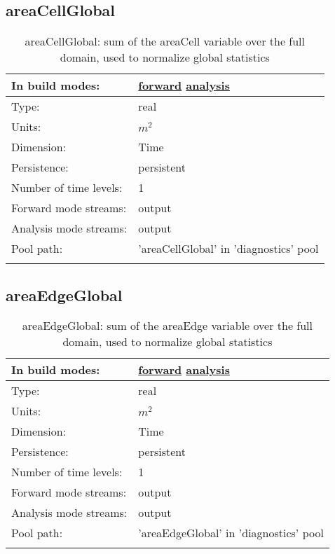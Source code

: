 \subsection[areaCellGlobal]{areaCellGlobal}
\label{subsec:var_sec_diagnostics_areaCellGlobal}
\begin{center}
\begin{longtable}{| p{2.0in} | p{4.0in} |}
        \hline 
        In build modes: & \hyperref[subsec:forward_var_tab_diagnostics]{forward} \hyperref[subsec:analysis_var_tab_diagnostics]{analysis} \\
        \hline 
        Type: & real \\
        \hline 
        Units: & $m^2$ \\
        \hline 
        Dimension: & Time \\
        \hline 
        Persistence: & persistent \\
        \hline 
        Number of time levels: & 1 \\
        \hline 
		 Forward mode streams: &  output \\
        \hline 
		 Analysis mode streams: &  output \\
        \hline 
            Pool path: & 'areaCellGlobal' in 'diagnostics' pool
 \\
		 \hline 
    \caption{areaCellGlobal: sum of the areaCell variable over the full domain, used to normalize global statistics}
\end{longtable}
\end{center}
\subsection[areaEdgeGlobal]{areaEdgeGlobal}
\label{subsec:var_sec_diagnostics_areaEdgeGlobal}
\begin{center}
\begin{longtable}{| p{2.0in} | p{4.0in} |}
        \hline 
        In build modes: & \hyperref[subsec:forward_var_tab_diagnostics]{forward} \hyperref[subsec:analysis_var_tab_diagnostics]{analysis} \\
        \hline 
        Type: & real \\
        \hline 
        Units: & $m^2$ \\
        \hline 
        Dimension: & Time \\
        \hline 
        Persistence: & persistent \\
        \hline 
        Number of time levels: & 1 \\
        \hline 
		 Forward mode streams: &  output \\
        \hline 
		 Analysis mode streams: &  output \\
        \hline 
            Pool path: & 'areaEdgeGlobal' in 'diagnostics' pool
 \\
		 \hline 
    \caption{areaEdgeGlobal: sum of the areaEdge variable over the full domain, used to normalize global statistics}
\end{longtable}
\end{center}
